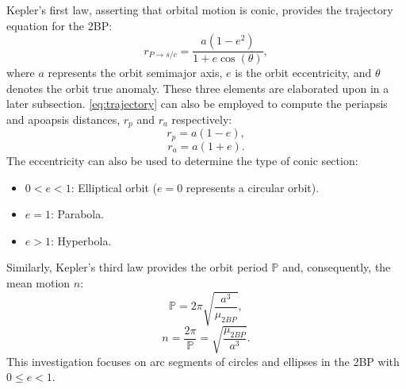 Kepler's first law, asserting that orbital motion is conic, provides the trajectory equation for
the 2BP:
\begin{equation}
    r_{P\rightarrow s/c}=\frac{a(1-e^{2})}{1+e\cos(\theta)},
    \label{eq:trajectory}
\end{equation}
where $a$ represents the orbit semimajor axis, $e$ is the orbit eccentricity, and $\theta$ denotes
the orbit true anomaly. These three elements are elaborated upon in a later subsection.
\cref{eq:trajectory} can also be employed to compute the periapsis and apoapsis distances, $r_{p}$
and $r_{a}$ respectively:
\begin{equation}
    r_{p}=a(1-e),
    \label{eq:periapsis}
\end{equation}
\begin{equation}
    r_{a}=a(1+e).
    \label{eq:apoapsis}
\end{equation}
The eccentricity can also be used to determine the type of conic section:
\begin{itemize}
    \item   $0<e<1$: Elliptical orbit ($e=0$ represents a circular orbit).
    \item   $e=1$: Parabola.
    \item   $e>1$: Hyperbola.
\end{itemize}
Similarly, Kepler's third law provides the orbit period $\mathbb{P}$ and, consequently, the mean
motion $n$:
\begin{equation}
    \mathbb{P}=2\pi\sqrt{\frac{a^{3}}{\mu_{2BP}}},
    \label{eq:period}
\end{equation}
\begin{equation}
    n=\frac{2\pi}{\mathbb{P}}=\sqrt{\frac{\mu_{2BP}}{a^{3}}}.
    \label{eq:meanmotion}
\end{equation}
This investigation focuses on arc segments of circles and ellipses in the 2BP with $0\leq e<1$.


